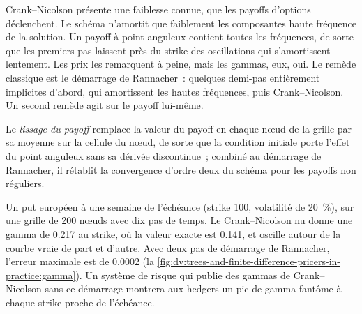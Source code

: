 Crank--Nicolson présente une faiblesse connue, que les payoffs d'options déclenchent. Le schéma n'amortit que faiblement les composantes haute fréquence de la
solution. Un payoff à point anguleux contient toutes les fréquences, de sorte que les premiers pas laissent près du strike des
oscillations qui s'amortissent lentement. Les prix les remarquent à peine, mais les gammas, eux, oui. Le remède classique est le démarrage de Rannacher~: quelques demi-pas entièrement implicites
d'abord, qui amortissent les hautes fréquences, puis Crank--Nicolson. Un second remède agit sur le payoff lui-même.

\begin{definition}\label{def:dv:trees-and-finite-difference-pricers-in-practice:smoothing}
Le \emph{lissage du payoff} remplace la valeur du payoff en chaque nœud de la grille par sa moyenne sur la cellule du
nœud, de sorte que la condition initiale porte l'effet du point anguleux sans sa dérivée discontinue~; combiné au démarrage de
Rannacher, il rétablit la convergence d'ordre deux du schéma pour les payoffs non réguliers.
\end{definition}

\begin{example}\label{ex:dv:trees-and-finite-difference-pricers-in-practice:gamma}
Un put européen à une semaine de l'échéance (strike 100, volatilité de 20~\%), sur une grille de 200 nœuds avec dix pas de temps. Le
Crank--Nicolson nu donne une gamma de 0.217 au strike, où la valeur exacte est 0.141, et oscille autour de la courbe vraie de
part et d'autre. Avec deux pas de démarrage de Rannacher, l'erreur maximale est de 0.0002
(la \cref{fig:dv:trees-and-finite-difference-pricers-in-practice:gamma}). Un système de risque qui publie des gammas de Crank--Nicolson
sans ce démarrage montrera aux hedgers un pic de gamma fantôme à chaque strike proche de l'échéance.
\end{example}

